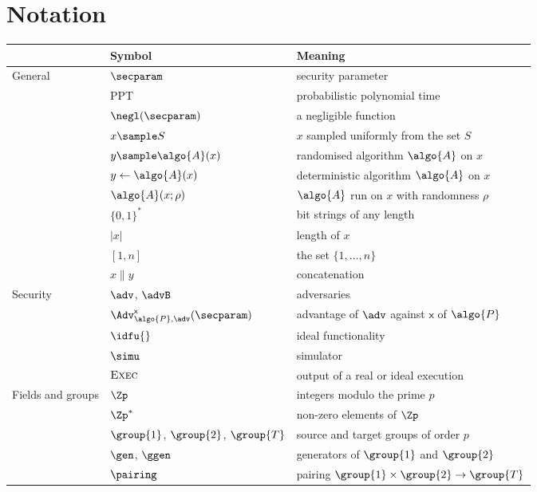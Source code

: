 \chapter*{Notation}\label{sec:notation}

\begin{longtable}{@{}l l p{}@{}}
\toprule
& Symbol & Meaning \\
\midrule
General & $\secparam$ & security parameter \\
 & PPT & probabilistic polynomial time \\
 & $\negl(\secparam)$ & a negligible function \\
 & $x \sample S$ & $x$ sampled uniformly from the set $S$ \\
 & $y \sample \algo{A}(x)$ & randomised algorithm $\algo{A}$ on $x$ \\
 & $y \leftarrow \algo{A}(x)$ & deterministic algorithm $\algo{A}$ on $x$ \\
 & $\algo{A}(x; \rho)$ & $\algo{A}$ run on $x$ with randomness $\rho$ \\
 & $\{0,1\}^*$ & bit strings of any length \\
 & $|x|$ & length of $x$ \\
 & $[1,n]$ & the set $\{1, \ldots, n\}$ \\
 & $x \| y$ & concatenation \\
\midrule
Security & $\adv$, $\advB$ & adversaries \\
 & $\Adv^{\mathsf{x}}_{\algo{P},\adv}(\secparam)$ & advantage of $\adv$ against $\mathsf{x}$ of $\algo{P}$ \\
 & $\idfu{}$ & ideal functionality \\
 & $\simu$ & simulator \\
 & $\textsc{Exec}$ & output of a real or ideal execution \\
\midrule
Fields and groups & $\Zp$ & integers modulo the prime $p$ \\
 & $\Zp^*$ & non-zero elements of $\Zp$ \\
 & $\group{1}$, $\group{2}$, $\group{T}$ & source and target groups of order $p$ \\
 & $\gen$, $\ggen$ & generators of $\group{1}$ and $\group{2}$ \\
 & $\pairing$ & pairing $\group{1} \times \group{2} \rightarrow \group{T}$ \\
\bottomrule
\end{longtable}
